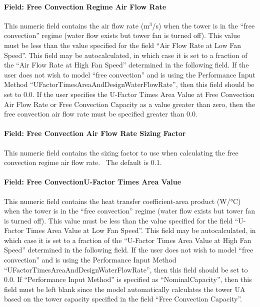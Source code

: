 \paragraph{Field: Free Convection Regime Air Flow Rate}\label{field-free-convection-regime-air-flow-rate}

This numeric field contains the air flow rate (m\(^{3}\)/s) when the tower is in the ``free convection'' regime (water flow exists but tower fan is turned off). This value must be less than the value specified for the field ``Air Flow Rate at Low Fan Speed''. This field may be autocalculated, in which case it is set to a fraction of the ``Air Flow Rate at High Fan Speed'' determined in the following field. If the user does not wish to model ``free convection'' and is using the Performance Input Method ``UFactorTimesAreaAndDesignWaterFlowRate'', then this field should be set to 0.0. If the user specifies the U-Factor Times Area Value at Free Convection Air Flow Rate or Free Convection Capacity as a value greater than zero, then the free convection air flow rate must be specified greater than 0.0.

\paragraph{Field: Free Convection Air Flow Rate Sizing Factor}\label{field-free-convection-air-flow-rate-sizing-factor}

This numeric field contains the sizing factor to use when calculating the free convection regime air flow rate.~ The default is 0.1.

\paragraph{Field: Free ConvectionU-Factor Times Area Value}\label{field-free-convectionu-factor-times-area-value}

This numeric field contains the heat transfer coefficient-area product (W/°C) when the tower is in the ``free convection'' regime (water flow exists but tower fan is turned off). This value must be less than the value specified for the field ``U-Factor Times Area Value at Low Fan Speed''. This field may be autocalculated, in which case it is set to a fraction of the ``U-Factor Times Area Value at High Fan Speed'' determined in the following field. If the user does not wish to model ``free convection'' and is using the Performance Input Method ``UFactorTimesAreaAndDesignWaterFlowRate'', then this field should be set to 0.0. If ``Performance Input Method'' is specified as ``NominalCapacity'', then this field must be left blank since the model automatically calculates the tower UA based on the tower capacity specified in the field ``Free Convection Capacity''.


